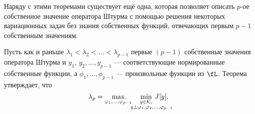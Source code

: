 Наряду с этими теоремами существует ещё одна, которая позволяет описать $p$-ое собственное значение оператора Штурма с помощью решения некоторых вариационных задач без знания собственных функций, отвечающих первым $p-1$ собственным значениям.
\begin{_teor}
	\label{l5:s2:teor:4}
	Пусть как и раньше $\lambda_1<\lambda_2<\ldots<\lambda_{p-1}$ первые $(p-1)$ собственные значения оператора Штурма и $y_1,\,y_2,\ldots,y_{p-1}$ --- соответствующие нормированные собственные функции, а $\phi_1,\ldots,\phi_{p-1}$ --- произвольные функции из $\fL$. Теорема утверждает, что
	\begin{equation}
		\label{l5:eq:12}
		\hfill\lambda_p=\max\limits_{\phi_1,\ldots,\phi_{p-1}}\quad\min\limits_{\substack{y\in\K,\\\lefteqn{\scriptstyle \hspace*{-0.8cm}y\perp\phi_1,\phi_2,\ldots,\phi_{p-1}}}}\,J[y].\hfill
	\end{equation}
\end{_teor}
